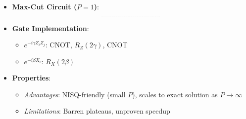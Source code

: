 \begin{multicols}{3}
\begin{itemize}[leftmargin=*,nosep,topsep=0pt]
                    \item \textbf{Max-Cut Circuit ($P=1$)}:
                      \[
                        \resizebox{0.25\textwidth}{!}{
                          \begin{quantikz}
                            \lstick{$q_0$} & \gate{H} & \gate{e^{-i\gamma Z Z}} & \gate{e^{-i\gamma Z Z}} & \gate{R_X(2\beta)} & \meter{} \\
                            \lstick{$q_1$} & \gate{H} & \gate[2]{Z Z} & \qw & \gate{R_X(2\beta)} & \meter{} \\
                            \lstick{$q_2$} & \gate{H} & \qw & \gate[2]{Z Z} & \gate{R_X(2\beta)} & \meter{} \\
                            \lstick{$q_3$} & \gate{H} & \qw & \qw & \gate{R_X(2\beta)} & \meter{}
                          \end{quantikz}
                        }
                      \]

                    \item \textbf{Gate Implementation}:
                      \begin{itemize}[nosep]
                        \item $e^{-i\gamma Z_i Z_j}$: CNOT, $R_Z(2\gamma)$, CNOT
                        \item $e^{-i\beta X_i}$: $R_X(2\beta)$
                      \end{itemize}

                    \item \textbf{Properties}:
                      \begin{itemize}[nosep]
                        \item \textit{Advantages}: NISQ-friendly (small $P$),
                          scales to exact solution as $P \to \infty$
                        \item \textit{Limitations}: Barren plateaus, unproven
                          speedup
                      \end{itemize}
                  \end{itemize}


                \end{multicols}
                \endgroup
